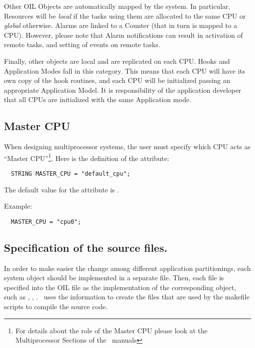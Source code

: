 Other OIL Objects are automatically mapped by the system. In
particular, Resources will be {\em local} if the tasks using them are
allocated to the same CPU or {\em global} otherwise. Alarms are linked
to a Counter (that in turn is mapped to a CPU). However, please note
that Alarm notifications can result in activation of remote tasks, and
setting of events on remote tasks.

Finally, other objects are local and are replicated on each CPU. Hooks
and Application Modes fall in this category. This means that each CPU
will have its own copy of the hook routines, and each CPU will be
initialized passing an appropriate Application Model. It is
responsibility of the application developer that all CPUs are
initialized with the same Application mode.


\subsection{Master CPU}
\label{sub:master-cpu}
%
%

When designing multiprocessor systems, the user must specify which CPU
acts as ``Master CPU''\footnote{For details about the role of the Master CPU
please look at the Multiprocessor Sections of the \ee\ manuals}. Here
is the definition of the  attribute:

\begin{lstlisting}
  STRING MASTER_CPU = "default_cpu";
\end{lstlisting}

The default value for the  attribute is
. 

Example:
\begin{lstlisting}
  MASTER_CPU = "cpu0";
\end{lstlisting}




\subsection{Specification of the source files.}

In order to make easier the change among different application 
partitionings, each
system object should be implemented in a separate file. Then, each
file is specified into the OIL file as the implementation of the
corresponding object, such as , ,
. \rtd\ uses the information to create the
 files that are used by the makefile scripts to
compile the source code.

